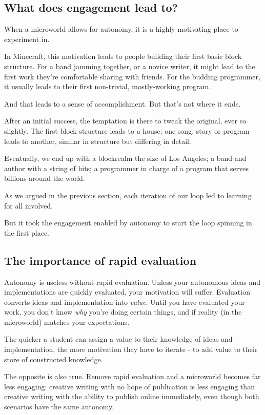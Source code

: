 \subsection{What does engagement lead to?}

When a microworld allows for autonomy, it is a highly motivating place
to experiment in.

In Minecraft, this motivation leads to people building their first basic
block structure. For a band jamming together, or a novice writer, it
might lead to the first work they're comfortable sharing with friends.
For the budding programmer, it usually leads to their first non-trivial,
mostly-working program.

And that leads to a sense of accomplishment. But that's not where it
ends.

After an initial success, the temptation is there to tweak the original,
ever so slightly. The first block structure leads to a house; one song,
story or program leads to another, similar in structure but differing in
detail.

Eventually, we end up with a blockrealm the size of Los Angeles; a band
and author with a string of hits; a programmer in charge of a program
that serves billions around the world.

As we argued in the previous section, each iteration of our loop led to
learning for all involved.

But it took the engagement enabled by autonomy to start the loop
spinning in the first place.

\subsection{The importance of rapid evaluation}

Autonomy is useless without rapid evaluation. Unless your autonomous ideas and implementations are quickly evaluated, your motivation will suffer\cite{drive}. Evaluation converts ideas and implementation into \emph{value}. Until you have evaluated your work, you don't know \emph{why} you're doing certain things, and if reality (in the microworld) matches your expectations. 

The quicker a student can assign a value to their knowledge of ideas and implementation, the more motivation they have to iterate - to add value to their store of constructed knowledge.

The opposite is also true. Remove rapid evaluation and a microworld becomes far less engaging: creative writing with no hope of publication is less engaging than creative writing with the ability to publish online immediately, even though both scenarios have the same autonomy.  

